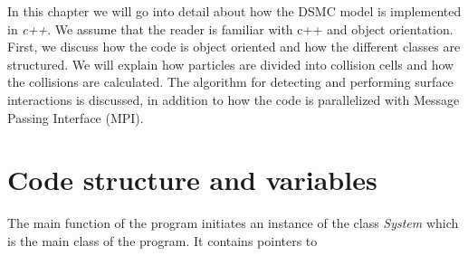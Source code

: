 In this chapter we will go into detail about how the DSMC model is implemented in \textit{c++}. We assume that the reader is familiar with c++ and object orientation. First, we discuss how the code is object oriented and how the different classes are structured. We will explain how particles are divided into collision cells and how the collisions are calculated. The algorithm for detecting and performing surface interactions is discussed, in addition to how the code is parallelized with Message Passing Interface (MPI). 
\section{Code structure and variables}
The main function of the program initiates an instance of the class \textit{System} which is the main class of the program. It contains pointers to 
